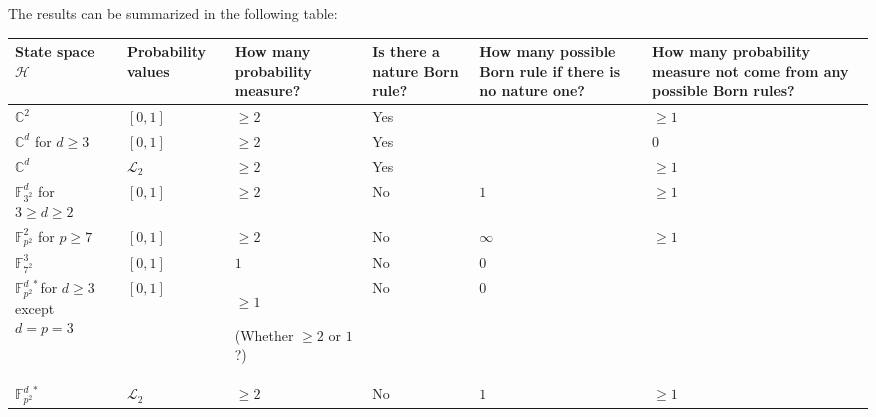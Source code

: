 \documentclass{article}
\theoremstyle{remark}
\newcommand{\Hilb}{\mathcal{H}}
\newcommand{\ffzd}[1]{{\mathbb{F}^{d\;*}_{#1}}}
\def\C{{\mathbb{C}}}
\newcommand{\ff}[1]{\mathbb{F}_{#1}}
\begin{document}
The results can be summarized in the following table:\\
\begin{tabular}{>{\raggedright}m{}>{\raggedright}m{}>{\raggedright}m{}>{\raggedright}m{}>{\raggedright}m{}>{\raggedright}m{}}
\hline 
State space $\Hilb$ & Probability values & How many probability measure? & Is there a nature Born rule? & How many possible Born rule if there is no nature one? & How many probability measure not come from any possible Born rules?\tabularnewline
\hline 
\hline 
$\C^{2}$ & $\left[0,1\right]$  & $\ge2$ & Yes &  & $\ge1$\tabularnewline
\hline 
$\C^{d}$ for $d\ge3$ & $\left[0,1\right]$  & $\ge2$ & Yes &  & $0$\tabularnewline
\hline 
$\C^{d}$ & $\mathscr{L}_{2}$ & $\ge2$ & Yes &  & $\ge1$\tabularnewline
\hline 
$\ff{3^{2}}^{d}$ for $3\ge d\ge2$ & $\left[0,1\right]$  & $\ge2$ & No & $1$ & $\ge1$\tabularnewline
\hline 
$\ff{p^{2}}^{2}$ for $p\ge7$ & $\left[0,1\right]$  & $\ge2$ & No & $\infty$ & $\ge1$\tabularnewline
\hline 
$\ff{7^{2}}^{3}$ & $\left[0,1\right]$  & $1$ & No & $0$ & \tabularnewline
\hline 
$\ffzd{p^{2}}$for $d\ge3$ except $d=p=3$ & $\left[0,1\right]$  & $\ge1$ 

(Whether $\ge2$ or $1$?) & No & $0$ & \tabularnewline
\hline 
$\ffzd{p^{2}}$ & $\mathscr{L}_{2}$ & $\ge2$ & No & $1$ & $\ge1$\tabularnewline
\hline 
\end{tabular}




\end{document}
